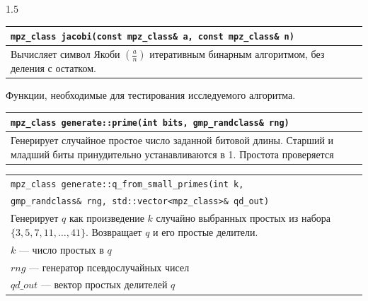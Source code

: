 \documentclass[14pt,a4paper]{extarticle}
\begin{document}
\begin{spacing}{1.5}
\vspace{0.2cm}
\noindent\begin{tabularx}{\textwidth}{|X|}
\hline
\texttt{mpz\_class jacobi(const mpz\_class\& a, const mpz\_class\& n)} \\
\hline
Вычисляет символ Якоби \(\left(\frac{a}{n}\right)\) итеративным бинарным алгоритмом, без деления с остатком. \\
\hline
\end{tabularx}

\vspace{0.5cm}
\noindent Функции, необходимые для тестирования исследуемого алгоритма.

\vspace{0.2cm}
\noindent\begin{tabularx}{\textwidth}{|X|}
\hline
\texttt{mpz\_class generate::prime(int bits, gmp\_randclass\& rng)} \\
\hline
Генерирует случайное простое число заданной битовой длины. Старший и младший биты принудительно устанавливаются в 1. Простота проверяется \\
\hline
\end{tabularx}

\vspace{0.2cm}
\noindent\begin{tabularx}{\textwidth}{|X|}
\hline
\texttt{mpz\_class generate::q\_from\_small\_primes(int k,}\\
\texttt{gmp\_randclass\& rng, std::vector<mpz\_class>\& qd\_out)} \\
\hline
Генерирует \(q\) как произведение \(k\) случайно выбранных простых из набора \(\{3, 5, 7, 11, \dots, 41\}\). Возвращает \(q\) и его простые делители. \\
\(k\) \hspace{0.8cm} — число простых в \(q\) \\
\(rng\) \hspace{0.5cm} — генератор псевдослучайных чисел \\
\(qd\_out\) — вектор простых делителей \(q\) \\
\hline
\end{tabularx}


\end{spacing}
\end{document}
